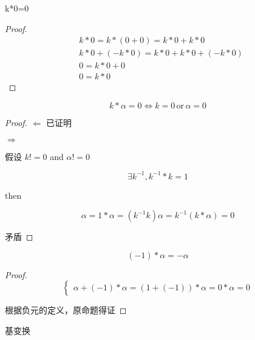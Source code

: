 \documentclass[12pt,hyperref,a4paper,UTF8]{ctexart}
\begin{document}
\begin{Proposition}
k*0=0
\end{Proposition}

\begin{proof}

\begin{align*}
&k*0=k*(0+0)=k*0+k*0\\
&k*0+(-k*0)=k*0+k*0+(-k*0)\\
&0=k*0+0\\
&0=k*0
\end{align*}

\end{proof}

\begin{Proposition}
$$k*\alpha=0\Longleftrightarrow k=0 \,\text{or}\, \alpha=0$$
\end{Proposition}

\begin{proof}
$\Leftarrow$ 已证明

$\Rightarrow$

假设 $k!=0$ and $\alpha!=0$

$$\exists k^{-1},k^{-1}*k=1$$

then

$$\alpha =1*\alpha=(k^{-1}k)\alpha=k^{-1}(k*\alpha)=0$$

矛盾
\end{proof}

\begin{Proposition}
$$(-1)*\alpha=-\alpha$$
\end{Proposition}

\begin{proof}
$$  \begin{cases}
       \alpha+(-1)*\alpha=(1+(-1))*\alpha=0*\alpha=0
    \end{cases}
$$

根据负元的定义，原命题得证
\end{proof}

基变换
\end{document}
